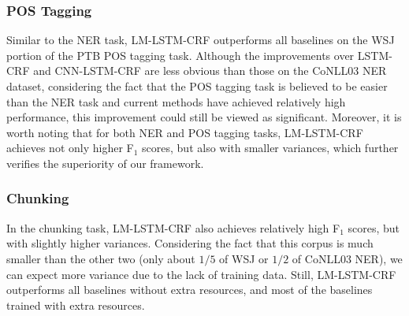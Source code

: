 \documentclass[letterpaper]{article} \usepackage{aaai18}  \usepackage{times}  \usepackage{helvet}  \usepackage{courier}  \usepackage{url}  \usepackage{graphicx}  \usepackage{multirow}
\newcommand{\our}{\textsc{LM-LSTM-CRF}\xspace}
\begin{document}
    \subsubsection{POS Tagging}
    Similar to the NER task, \our outperforms all baselines on the WSJ portion of the PTB POS tagging task. 
    Although the improvements over LSTM-CRF and CNN-LSTM-CRF are less obvious than those on the CoNLL03 NER dataset, considering the fact that the POS tagging task is believed to be easier than the NER task and current methods have achieved relatively high performance, this improvement could still be viewed as significant.
    Moreover, it is worth noting that for both NER and POS tagging tasks, \our achieves not only higher F$_1$ scores, but also with smaller variances, which further verifies the superiority of our framework.

    \subsubsection{Chunking}
    In the chunking task, \our also achieves relatively high F$_1$ scores, but with slightly higher variances.
    Considering the fact that this corpus is much smaller than the other two (only about $1/5$ of WSJ or $1/2$ of CoNLL03 NER), we can expect more variance due to the lack of training data.
    Still, \our outperforms all baselines without extra resources, and most of the baselines trained with extra resources.
\end{document}
